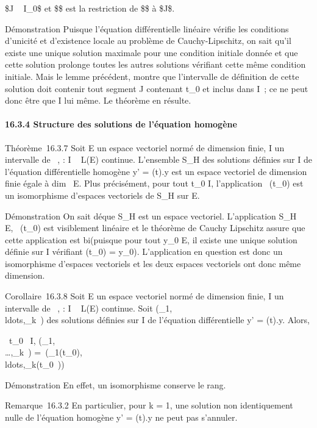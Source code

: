 \documentclass[]{article}
\begin{document}
\text\$J \subset~ I\_0\$ et \$\psi\$ est la restriction
de \$\phi\$ à \$J\$.

Démonstration Puisque l'équation différentielle linéaire vérifie les
conditions d'unicité et d'existence locale au problème de
Cauchy-Lipschitz, on sait qu'il existe une unique solution maximale pour
une condition initiale donnée et que cette solution prolonge toutes les
autres solutions vérifiant cette même condition initiale. Mais le lemme
précédent, montre que l'intervalle de définition de cette solution doit
contenir tout segment J contenant t\_0 et inclus dans I~; ce ne
peut donc être que I lui même. Le théorème en résulte.

\paragraph{16.3.4 Structure des solutions de l'équation homogène}

Théorème~16.3.7 Soit E un espace vectoriel normé de dimension finie, I
un intervalle de ~, \ell : I \rightarrow~ L(E) continue. L'ensemble S\_H des
solutions définies sur I de l'équation différentielle homogène y' =
\ell(t).y est un espace vectoriel de dimension finie égale à
dim~ E. Plus précisément, pour tout
t\_0 \in I, l'application
\phi\mapsto~\phi(t\_0) est un isomorphisme
d'espaces vectoriels de S\_H sur E.

Démonstration On sait dé que S\_H est un espace vectoriel.
L'application S\_H \rightarrow~ E,
\phi\mapsto~\phi(t\_0) est visiblement linéaire et
le théorème de Cauchy Lipschitz assure que cette application est
bi\jmathective (puisque pour tout y\_0 \in E, il existe une unique
solution définie sur I vérifiant \phi(t\_0) = y\_0).
L'application en question est donc un isomorphisme d'espaces vectoriels
et les deux espaces vectoriels ont donc même dimension.

Corollaire~16.3.8 Soit E un espace vectoriel normé de dimension finie, I
un intervalle de ~, \ell : I \rightarrow~ L(E) continue. Soit
(\phi\_1,\\ldots,\phi\_k~)
des solutions définies sur I de l'équation différentielle y' = \ell(t).y.
Alors,

\forall~t\_0~ \in I,
\mathrmrg(\phi\_1,\\\ldots,\phi\_k~)
=\
\mathrmrg(\phi\_1(t\_0),\\ldots,\phi\_k(t\_0~))

Démonstration En effet, un isomorphisme conserve le rang.

Remarque~16.3.2 En particulier, pour k = 1, une solution non
identiquement nulle de l'équation homogène y' = \ell(t).y ne peut pas
s'annuler.
\end{document}
